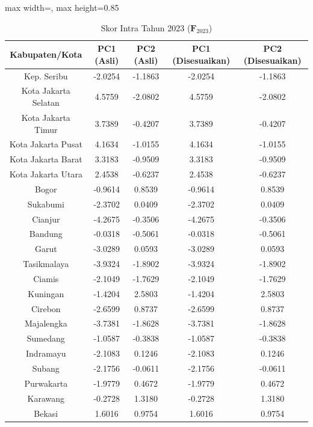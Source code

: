 \begin{table}[H]
\centering
\caption{Skor Intra Tahun 2023 ($\mathbf{F}_{2023}$)} \makeatletter{}\makeatother
\begin{adjustbox}{max width=\textwidth, max height=0.85\textheight}
\begin{tabular}{|c|c|c|c|c|}
\hline
\textbf{Kabupaten/Kota} & \textbf{PC1 (Asli)} & \textbf{PC2 (Asli)} & \textbf{PC1 (Disesuaikan)} & \textbf{PC2 (Disesuaikan)} \\
\hline
Kep. Seribu & -2.0254 & -1.1863 & -2.0254 & -1.1863 \\
Kota Jakarta Selatan & 4.5759 & -2.0802 & 4.5759 & -2.0802 \\
Kota Jakarta Timur & 3.7389 & -0.4207 & 3.7389 & -0.4207 \\
Kota Jakarta Pusat & 4.1634 & -1.0155 & 4.1634 & -1.0155 \\
Kota Jakarta Barat & 3.3183 & -0.9509 & 3.3183 & -0.9509 \\
Kota Jakarta Utara & 2.4538 & -0.6237 & 2.4538 & -0.6237 \\
Bogor & -0.9614 & 0.8539 & -0.9614 & 0.8539 \\
Sukabumi & -2.3702 & 0.0409 & -2.3702 & 0.0409 \\
Cianjur & -4.2675 & -0.3506 & -4.2675 & -0.3506 \\
Bandung & -0.0318 & -0.5061 & -0.0318 & -0.5061 \\
Garut & -3.0289 & 0.0593 & -3.0289 & 0.0593 \\
Tasikmalaya & -3.9324 & -1.8902 & -3.9324 & -1.8902 \\
Ciamis & -2.1049 & -1.7629 & -2.1049 & -1.7629 \\
Kuningan & -1.4204 & 2.5803 & -1.4204 & 2.5803 \\
Cirebon & -2.6599 & 0.8737 & -2.6599 & 0.8737 \\
Majalengka & -3.7381 & -1.8628 & -3.7381 & -1.8628 \\
Sumedang & -1.0587 & -0.3838 & -1.0587 & -0.3838 \\
Indramayu & -2.1083 & 0.1246 & -2.1083 & 0.1246 \\
Subang & -2.1756 & -0.0611 & -2.1756 & -0.0611 \\
Purwakarta & -1.9779 & 0.4672 & -1.9779 & 0.4672 \\
Karawang & -0.2728 & 1.3180 & -0.2728 & 1.3180 \\
Bekasi & 1.6016 & 0.9754 & 1.6016 & 0.9754 \\

\end{tabular}
\end{adjustbox}
\end{table}
